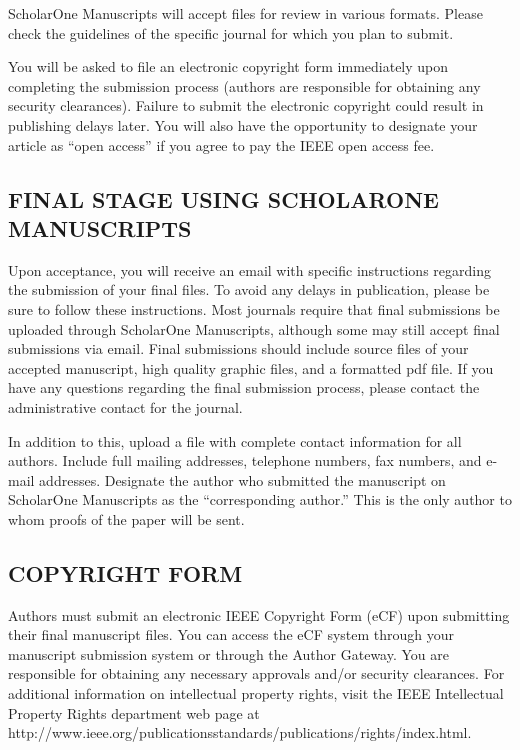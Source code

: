 ScholarOne Manuscripts will accept files for review in various formats. 
Please check the guidelines of the specific journal for which you plan to 
submit. 

You will be asked to file an electronic copyright form immediately upon 
completing the submission process (authors are responsible for obtaining any 
security clearances). Failure to submit the electronic copyright could 
result in publishing delays later. You will also have the opportunity to 
designate your article as ``open access'' if you agree to pay the IEEE open 
access fee. 

\subsection{FINAL STAGE USING SCHOLARONE MANUSCRIPTS}
Upon acceptance, you will receive an email with specific instructions 
regarding the submission of your final files. To avoid any delays in 
publication, please be sure to follow these instructions. Most journals 
require that final submissions be uploaded through ScholarOne Manuscripts, 
although some may still accept final submissions via email. Final 
submissions should include source files of your accepted manuscript, high 
quality graphic files, and a formatted pdf file. If you have any questions 
regarding the final submission process, please contact the administrative 
contact for the journal. 

In addition to this, upload a file with complete contact information for all 
authors. Include full mailing addresses, telephone numbers, fax numbers, and 
e-mail addresses. Designate the author who submitted the manuscript on 
ScholarOne Manuscripts as the ``corresponding author.'' This is the only 
author to whom proofs of the paper will be sent. 

\subsection{COPYRIGHT FORM}
Authors must submit an electronic IEEE Copyright Form (eCF) upon submitting 
their final manuscript files. You can access the eCF system through your 
manuscript submission system or through the Author Gateway. You are 
responsible for obtaining any necessary approvals and/or security 
clearances. For additional information on intellectual property rights, 
visit the IEEE Intellectual Property Rights department web page at 
http://www.ieee.org/publications\textunderscore\discretionary{}{}{}standards/publications/rights/index.html. 

